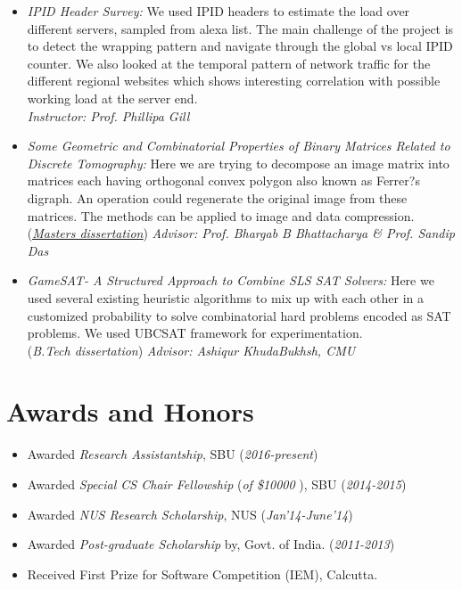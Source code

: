 \documentclass{res}
\begin{document}
\begin{resume}
\begin{itemize}
 \item{ \it{IPID Header Survey:}} We used IPID headers to estimate the load over different servers, sampled from alexa
 list. The main challenge of the project is to detect the wrapping pattern and navigate through the global vs local IPID counter. 
 We also looked at the temporal pattern of network traffic for the different regional websites which shows interesting correlation with possible 
 working load at the server end. \\
 {\it Instructor: Prof. Phillipa Gill}
 
 \item {{\it Some Geometric and Combinatorial Properties of Binary Matrices Related to
Discrete Tomography:}} Here we are trying to decompose an image matrix into matrices
each having orthogonal convex polygon also known as Ferrer?s digraph. An operation could
regenerate the original image from these matrices. The methods can be applied to image and
data compression. (\href{https://drive.google.com/open?id=0B3ErYrn4jOcxSHhReVF6cmROelE}{\it  \underline{Masters dissertation}}) 
{\it Advisor: Prof. Bhargab B Bhattacharya \& Prof. Sandip Das}

 \item 
 {{\it GameSAT- A Structured Approach to Combine SLS SAT Solvers:}} Here we used several existing heuristic algorithms to mix up with each other in a customized probability to solve combinatorial hard problems encoded as SAT problems. We used UBCSAT framework for experimentation. \\
({\it B.Tech dissertation}) {\it Advisor: Ashiqur KhudaBukhsh, CMU}
 
 \end{itemize}
 
 
\section{Awards and Honors}
   \begin{itemize}
   \item Awarded {\it Research Assistantship}, SBU ({\it 2016-present})
   \item Awarded {\it Special CS Chair Fellowship} ({\it of \$10000} ), SBU ({\it 2014-2015})
   \item Awarded {\it NUS Research Scholarship}, NUS ({\it Jan'14-June'14})
   \item Awarded {\it Post-graduate Scholarship} by, Govt. of India. ({\it 2011-2013}) 
   \item Received {\color{blue} First Prize} for Software Competition (IEM), Calcutta.
   \end{itemize}


\end{resume}
\end{document}
